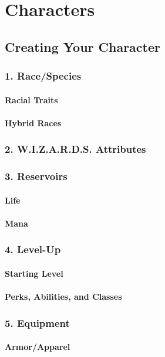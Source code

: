 
\part{Characters}


\chapter{Creating Your Character}
\section{1. Race/Species}
\subsection{Racial Traits}
\subsection{Hybrid Races}
\section{2. W.I.Z.A.R.D.S. Attributes}
\section{3. Reservoirs}
\subsection{Life}
\subsection{Mana}
\section{4. Level-Up}
\subsection{Starting Level}
\subsection{Perks, Abilities, and Classes}
\section{5. Equipment}
\subsection{Armor/Apparel}



